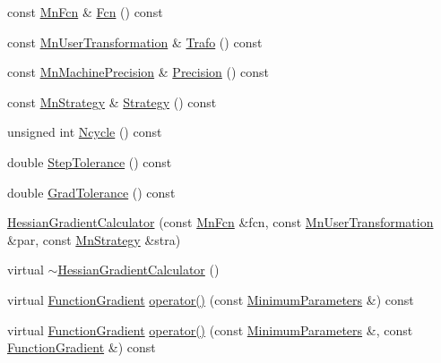 \begin{DoxyCompactItemize}
\item 
const \mbox{\hyperlink{classROOT_1_1Minuit2_1_1MnFcn}{Mn\+Fcn}} \& \mbox{\hyperlink{classROOT_1_1Minuit2_1_1HessianGradientCalculator_ae23f4348f9a64595c39db48aa48d9e09}{Fcn}} () const
\item 
const \mbox{\hyperlink{classROOT_1_1Minuit2_1_1MnUserTransformation}{Mn\+User\+Transformation}} \& \mbox{\hyperlink{classROOT_1_1Minuit2_1_1HessianGradientCalculator_a4b122eecb0217cab813601572ccbac74}{Trafo}} () const
\item 
const \mbox{\hyperlink{classROOT_1_1Minuit2_1_1MnMachinePrecision}{Mn\+Machine\+Precision}} \& \mbox{\hyperlink{classROOT_1_1Minuit2_1_1HessianGradientCalculator_a256d75d036a5c53b0b679830ca4ac714}{Precision}} () const
\item 
const \mbox{\hyperlink{classROOT_1_1Minuit2_1_1MnStrategy}{Mn\+Strategy}} \& \mbox{\hyperlink{classROOT_1_1Minuit2_1_1HessianGradientCalculator_a407171e2df12fa67e92c0e5b7a97bb8d}{Strategy}} () const
\item 
unsigned int \mbox{\hyperlink{classROOT_1_1Minuit2_1_1HessianGradientCalculator_a234641f72296f007b2d95b514be07138}{Ncycle}} () const
\item 
double \mbox{\hyperlink{classROOT_1_1Minuit2_1_1HessianGradientCalculator_ac66592218817d4cbc8a3be76938b435d}{Step\+Tolerance}} () const
\item 
double \mbox{\hyperlink{classROOT_1_1Minuit2_1_1HessianGradientCalculator_a17febf33fcbeafa556e703d8bbe3d1db}{Grad\+Tolerance}} () const
\item 
\mbox{\hyperlink{classROOT_1_1Minuit2_1_1HessianGradientCalculator_af298f780f59cb2be1ac5e676af07f82b}{Hessian\+Gradient\+Calculator}} (const \mbox{\hyperlink{classROOT_1_1Minuit2_1_1MnFcn}{Mn\+Fcn}} \&fcn, const \mbox{\hyperlink{classROOT_1_1Minuit2_1_1MnUserTransformation}{Mn\+User\+Transformation}} \&par, const \mbox{\hyperlink{classROOT_1_1Minuit2_1_1MnStrategy}{Mn\+Strategy}} \&stra)
\item 
virtual \mbox{\hyperlink{classROOT_1_1Minuit2_1_1HessianGradientCalculator_abb91fad11c0bbff5199e4da1f03b1fb3}{$\sim$\+Hessian\+Gradient\+Calculator}} ()
\item 
virtual \mbox{\hyperlink{classROOT_1_1Minuit2_1_1FunctionGradient}{Function\+Gradient}} \mbox{\hyperlink{classROOT_1_1Minuit2_1_1HessianGradientCalculator_af65e43d99c763df00e3d082d59a7a24d}{operator()}} (const \mbox{\hyperlink{classROOT_1_1Minuit2_1_1MinimumParameters}{Minimum\+Parameters}} \&) const
\item 
virtual \mbox{\hyperlink{classROOT_1_1Minuit2_1_1FunctionGradient}{Function\+Gradient}} \mbox{\hyperlink{classROOT_1_1Minuit2_1_1HessianGradientCalculator_af6fed0f29a33ec23f97451562d41cfaa}{operator()}} (const \mbox{\hyperlink{classROOT_1_1Minuit2_1_1MinimumParameters}{Minimum\+Parameters}} \&, const \mbox{\hyperlink{classROOT_1_1Minuit2_1_1FunctionGradient}{Function\+Gradient}} \&) const

\end{DoxyCompactItemize}
